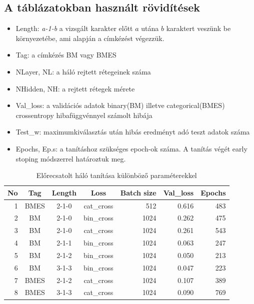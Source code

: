 \documentclass[a4paper, magyar]{article}
\begin{document}
\subsection{A táblázatokban használt rövidítések}
\begin{itemize}
	\item Length: \textit{a-1-b} a vizsgált karakter előtt $a$ utána $b$ karaktert veszünk be környezetébe, ami alapján a címkézést végezzük.
	\item Tag: a címkézés BM vagy BMES
	\item NLayer, NL: a háló rejtett rétegeinek száma
	\item NHidden, NH: a rejtett rétegek mérete
	\item Val\_loss: a validációs adatok binary(BM) illetve categorical(BMES) crossentropy hibafüggvénnyel számolt hibája
	\item Test\_w: maximumkiválasztás után hibás eredményt adó teszt adatok száma
	\item Epochs, Ep.s: a tanításhoz szükséges epoch-ok száma. A tanítás végét early stoping módszerrel határoztuk meg.
\end{itemize}
\begin{table}[htp]\centering
	\begin{tabular}{|r|c|c|c|r|r|r|}
		\hline
		No&Tag&Length&Loss&Batch size&Val\_loss&Epochs\\
		\hline\hline
		1&BMES&2-1-0&cat\_cross&512&0.616&483\\ 
		\hline
		2&BM&2-1-0&bin\_cross&1024&0.262&475\\
		\hline
		3&BM&2-1-0&cat\_cross&1024&0.261&543\\
		\hline
		4&BM&2-1-1&bin\_cross&1024&0.063&247\\
		\hline
		5&BM&2-1-2&bin\_cross&1024&0.050&213\\
		\hline
		6&BM&3-1-3&bin\_cross&1024&0.047&223\\
		\hline
		7&BMES&2-1-2&cat\_cross&1024&0.107&389\\
		\hline
		8&BMES&3-1-3&cat\_cross&1024&0.090&769\\
		\hline
	\end{tabular}
	\caption{Előrecsatolt háló tanítása különböző paraméterekkel}
	\label{tab:firstlearn}
\end{table}
\end{document}
